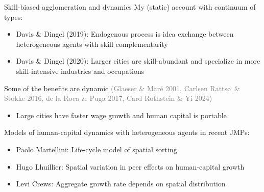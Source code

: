 \documentclass[11pt,notes=hide,aspectratio=169]{beamer}
\begin{document}
\begin{frame}{Skill-biased agglomeration and dynamics}
My (static) account with continuum of types:
\begin{itemize}
\item Davis \& Dingel (2019):
Endogenous process is idea exchange between heterogeneous agents with skill complementarity
\item Davis \& Dingel (2020):
Larger cities are skill-abundant and specialize in more skill-intensive industries and occupations
\end{itemize}
Some of the benefits are dynamic {\small \textcolor{gray}{(Glaeser \& Mar\'{e} 2001, Carlsen Ratts\o\ \& Stokke 2016, de la Roca \& Puga 2017, Card Rothstein \& Yi 2024)}}
\begin{itemize}
\item
Large cities have faster wage growth and human capital is portable
\end{itemize}
\smallskip
Models of human-capital dynamics with heterogeneous agents in recent JMPs:
\begin{itemize}
\item Paolo Martellini:
Life-cycle model of spatial sorting
\item Hugo Lhuillier:
Spatial variation in peer effects on human-capital growth
\item Levi Crews:
Aggregate growth rate depends on spatial distribution %
\end{itemize}
\end{frame}
\end{document}

